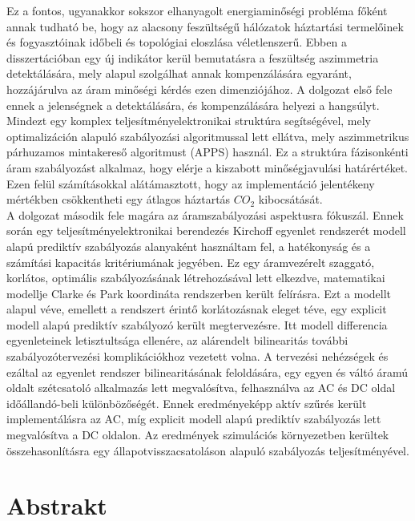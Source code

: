Ez a fontos, ugyanakkor sokszor elhanyagolt energiaminőségi probléma főként annak tudható be, hogy az alacsony feszültségű hálózatok háztartási termelőinek és fogyasztóinak időbeli és topológiai eloszlása véletlenszerű. Ebben a disszertációban egy új indikátor kerül bemutatásra a feszültség aszimmetria detektálására, mely alapul szolgálhat annak kompenzálására egyaránt, hozzájárulva az áram minőségi kérdés ezen dimenziójához. A dolgozat első fele ennek a jelenségnek a detektálására, és kompenzálására helyezi a hangsúlyt. Mindezt egy komplex teljesítményelektronikai struktúra segítségével, mely optimalizáción alapuló szabályozási algoritmussal lett ellátva, mely aszimmetrikus párhuzamos mintakereső algoritmust (APPS) használ. Ez a struktúra fázisonkénti áram szabályozást alkalmaz, hogy elérje a kiszabott minőségjavulási határértéket. Ezen felül számításokkal alátámasztott, hogy az implementáció jelentékeny mértékben csökkentheti egy átlagos háztartás $CO_2$ kibocsátását.\\
A dolgozat második fele magára az áramszabályozási aspektusra fókuszál. Ennek során egy teljesítményelektronikai berendezés Kirchoff egyenlet rendszerét modell alapú prediktív szabályozás alanyaként használtam fel, a hatékonyság és a számítási kapacitás kritériumának jegyében. Ez egy áramvezérelt szaggató, korlátos, optimális szabályozásának létrehozásával lett elkezdve, matematikai modellje Clarke és Park koordináta rendszerben került felírásra. Ezt a modellt alapul véve, emellett a rendszert érintő korlátozásnak eleget téve, egy explicit modell alapú prediktív szabályozó került megtervezésre. Itt modell differencia egyenleteinek letisztultsága ellenére, az alárendelt bilinearitás további szabályozótervezési komplikációkhoz vezetett volna. A tervezési nehézségek és ezáltal az egyenlet rendszer bilinearitásának feloldására, egy egyen és váltó áramú oldalt szétcsatoló alkalmazás lett megvalósítva, felhasználva az AC és DC oldal időállandó-beli különbözőségét. Ennek eredményeképp aktív szűrés került implementálásra az AC, míg explicit modell alapú prediktív szabályozás lett megvalósítva a DC oldalon. Az eredmények szimulációs környezetben kerültek összehasonlításra egy állapotvisszacsatoláson alapuló szabályozás teljesítményével.

\chapter*{Abstrakt}
\thispagestyle{plain}



